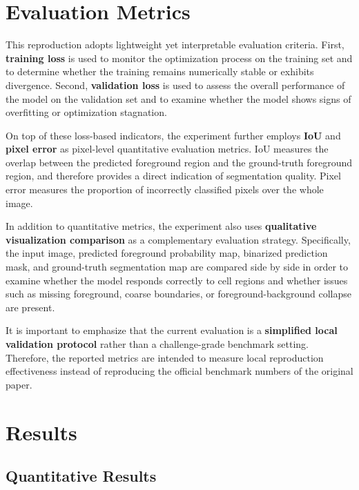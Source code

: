 \documentclass[11pt]{article}
\begin{document}
\section{Evaluation Metrics}

This reproduction adopts lightweight yet interpretable evaluation criteria. First, \textbf{training loss} is used to monitor the optimization process on the training set and to determine whether the training remains numerically stable or exhibits divergence. Second, \textbf{validation loss} is used to assess the overall performance of the model on the validation set and to examine whether the model shows signs of overfitting or optimization stagnation.

On top of these loss-based indicators, the experiment further employs \textbf{IoU} and \textbf{pixel error} as pixel-level quantitative evaluation metrics. IoU measures the overlap between the predicted foreground region and the ground-truth foreground region, and therefore provides a direct indication of segmentation quality. Pixel error measures the proportion of incorrectly classified pixels over the whole image.

In addition to quantitative metrics, the experiment also uses \textbf{qualitative visualization comparison} as a complementary evaluation strategy. Specifically, the input image, predicted foreground probability map, binarized prediction mask, and ground-truth segmentation map are compared side by side in order to examine whether the model responds correctly to cell regions and whether issues such as missing foreground, coarse boundaries, or foreground-background collapse are present.

It is important to emphasize that the current evaluation is a \textbf{simplified local validation protocol} rather than a challenge-grade benchmark setting. Therefore, the reported metrics are intended to measure local reproduction effectiveness instead of reproducing the official benchmark numbers of the original paper.

\section{Results}

\subsection{Quantitative Results}
\end{document}
